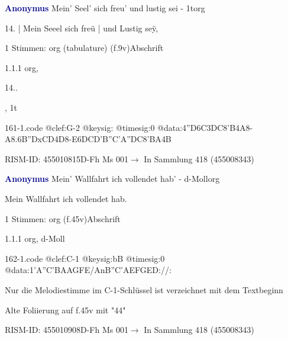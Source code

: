 \documentclass[twocolumn, 12pt]{book}
\begin{document}
\par \vspace{16pt} \textcolor{darkblue}{\textbf{Anonymus  }}\hfillplus{\textbf{[161]}}\newline Mein' Seel' sich freu' und lustig sei - 1t\newline org
\par \begin{itshape}[f.9v, at left:] 14. | Mein Seeel sich freü | und Lustig seÿ,\end{itshape} 
\par \textcolor{darkblue}{}  1 Stimmen: org (tabulature)  (f.9v)\newline Abschrift
\par 1.1.1  org, \begin{itshape}14..\end{itshape}, 1t  
\begin{filecontents*}{161-1.code}
@clef:G-2
@keysig:
@timesig:0
@data:4''D{6C3DC8'B}4A8-A{8.6B''DxCD}4D8-E{6DCD'B}{''C'A''DC}{8'BA}4B
\end{filecontents*}
\newline %
\par RISM-ID: 455010815\newline D-Fh  Ms 001\newline $\rightarrow$ In Sammlung 418 (455008343)
      
\par \vspace{16pt} \textcolor{darkblue}{\textbf{Anonymus  }}\hfillplus{\textbf{[162]}}\newline Mein' Wallfahrt ich vollendet hab' - d-Moll\newline org
\par \begin{itshape}[f.45v, at left:] Mein Wallfahrt ich vollendet hab.\end{itshape} 
\par \textcolor{darkblue}{}  1 Stimmen: org  (f.45v)\newline Abschrift
\par 1.1.1  org, d-Moll  
\begin{filecontents*}{162-1.code}
@clef:C-1
@keysig:bB
@timesig:0
@data:1'A''C'BAAGFE/AnB''C'AEFGED://:
\end{filecontents*}
\newline %
\par Nur die Melodiestimme im C-1-Schlüssel ist verzeichnet mit dem Textbeginn
\par Alte Foliierung auf f.45v mit "44"
\par RISM-ID: 455010908\newline D-Fh  Ms 001\newline $\rightarrow$ In Sammlung 418 (455008343)
      
\end{document}
